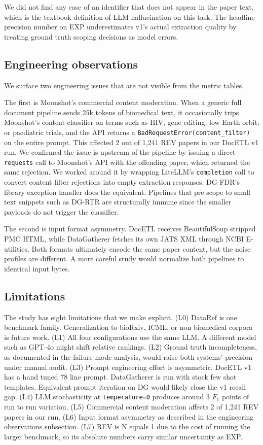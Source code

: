\documentclass[sigconf,nonacm]{acmart}
\begin{document}
We did not find any case of an identifier that does not appear in the paper text, which is the textbook definition of LLM hallucination on this task. The headline precision number on EXP underestimates v1's actual extraction quality by treating ground truth scoping decisions as model errors.

\subsection{Engineering observations}

We surface two engineering issues that are not visible from the metric tables.

The first is Moonshot's commercial content moderation. When a generic full document pipeline sends 25k tokens of biomedical text, it occasionally trips Moonshot's content classifier on terms such as HIV, gene editing, low Earth orbit, or paediatric trials, and the API returns a \texttt{BadRequestError(content\_filter)} on the entire prompt. This affected 2 out of 1{,}241 REV papers in our DocETL v1 run. We confirmed the issue is upstream of the pipeline by issuing a direct \texttt{requests} call to Moonshot's API with the offending paper, which returned the same rejection. We worked around it by wrapping LiteLLM's \texttt{completion} call to convert content filter rejections into empty extraction responses. DG-FDR's library exception handler does the equivalent. Pipelines that pre scope to small text snippets such as DG-RTR are structurally immune since the smaller payloads do not trigger the classifier.

The second is input format asymmetry. DocETL receives BeautifulSoup stripped PMC HTML, while DataGatherer fetches its own JATS XML through NCBI E-utilities. Both formats ultimately encode the same paper content, but the noise profiles are different. A more careful study would normalize both pipelines to identical input bytes.

\subsection{Limitations}

The study has eight limitations that we make explicit. (L0) DataRef is one benchmark family. Generalization to bioRxiv, ICML, or non biomedical corpora is future work. (L1) All four configurations use the same LLM. A different model such as GPT-4o might shift relative rankings. (L2) Ground truth incompleteness, as documented in the failure mode analysis, would raise both systems' precision under manual audit. (L3) Prompt engineering effort is asymmetric. DocETL v1 has a hand tuned 78 line prompt. DataGatherer is run with stock few shot templates. Equivalent prompt iteration on DG would likely close the v1 recall gap. (L4) LLM stochasticity at \texttt{temperature=0} produces around 3 $F_1$ points of run to run variation. (L5) Commercial content moderation affects 2 of 1{,}241 REV papers in our run. (L6) Input format asymmetry as described in the engineering observations subsection. (L7) REV is N equals 1 due to the cost of running the larger benchmark, so its absolute numbers carry similar uncertainty as EXP.
\end{document}
